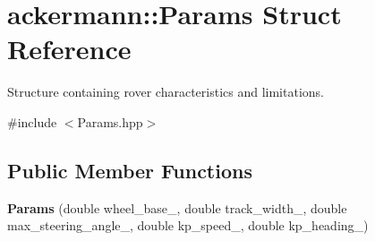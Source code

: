 \hypertarget{structackermann_1_1_params}{}\section{ackermann\+:\+:Params Struct Reference}
\label{structackermann_1_1_params}


Structure containing rover characteristics and limitations.  




{\ttfamily \#include $<$Params.\+hpp$>$}

\subsection*{Public Member Functions}
\begin{DoxyCompactItemize}
\item 
\mbox{\label{structackermann_1_1_params_a4d036653d2b7f9e6cbfaea12d5dca6f4}} 
{\bfseries Params} (double wheel\+\_\+base\+\_\+, double track\+\_\+width\+\_\+, double max\+\_\+steering\+\_\+angle\+\_\+, double kp\+\_\+speed\+\_\+, double kp\+\_\+heading\+\_\+)
\end{DoxyCompactItemize}
